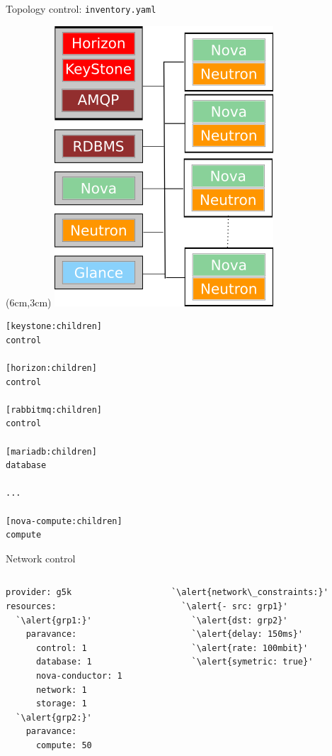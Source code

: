 \documentclass[10pt]{beamer}
\begin{document}
\begin{frame}[fragile]{Topology control: \texttt{inventory.yaml}}
  \begin{textblock*}{.4\paperwidth}(6cm,3cm)
	 \includegraphics[scale=.5]{figs/topology_control.png}
  \end{textblock*}

  \begin{lstlisting}[basicstyle=\ttfamily\small]
[keystone:children]
control

[horizon:children]
control

[rabbitmq:children]
control

[mariadb:children]
database

...

[nova-compute:children]
compute
  \end{lstlisting}
\end{frame}

\begin{frame}[fragile]{Network control}
  \begin{columns}
    \begin{column}{.45\textwidth}
      \begin{lstlisting}
provider: g5k
resources:
  `\alert{grp1:}'
    paravance:
      control: 1
      database: 1
      nova-conductor: 1
      network: 1
      storage: 1
  `\alert{grp2:}'
    paravance:
      compute: 50
      \end{lstlisting}
    \end{column}
    \begin{column}{.45\textwidth}
      \begin{lstlisting}
`\alert{network\_constraints:}'
  `\alert{- src: grp1}'
    `\alert{dst: grp2}'
    `\alert{delay: 150ms}'
    `\alert{rate: 100mbit}'
    `\alert{symetric: true}'
      \end{lstlisting}
    \end{column}
  \end{columns}
\end{frame}
\end{document}
